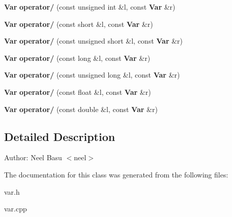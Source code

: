 \begin{CompactItemize}
\item 
{\bf Var} \textbf{operator/} (const unsigned int \&l, const {\bf Var} \&r)\label{classVar_1214b9a70f230aa5f0f92e2fd4a1be45}

\item 
{\bf Var} \textbf{operator/} (const short \&l, const {\bf Var} \&r)\label{classVar_101734bcd7f5a9c1a208e187dab792c7}

\item 
{\bf Var} \textbf{operator/} (const unsigned short \&l, const {\bf Var} \&r)\label{classVar_d97468551c1506c373f2afdb88f40cbe}

\item 
{\bf Var} \textbf{operator/} (const long \&l, const {\bf Var} \&r)\label{classVar_4815e00071aae3e86ea109e556b74946}

\item 
{\bf Var} \textbf{operator/} (const unsigned long \&l, const {\bf Var} \&r)\label{classVar_be9bd4aa91c5fda4e4bf8c857dc55e1d}

\item 
{\bf Var} \textbf{operator/} (const float \&l, const {\bf Var} \&r)\label{classVar_3e60892575af5103410d047ca898cbdf}

\item 
{\bf Var} \textbf{operator/} (const double \&l, const {\bf Var} \&r)\label{classVar_d89ff5777f14e0851a010dacfcaa6789}

\end{CompactItemize}


\subsection{Detailed Description}
\begin{Desc}
\item[Author:]Neel Basu $<$neel$>$ \end{Desc}


The documentation for this class was generated from the following files:\begin{CompactItemize}
\item 
var.h\item 
var.cpp\end{CompactItemize}
